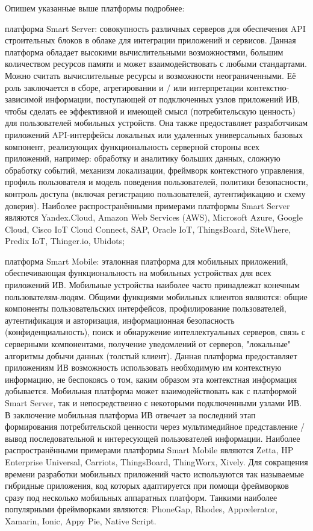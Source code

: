 Опишем указанные выше платформы подробнее:
\begin{textitemize}
    \item платформа Smart Server: совокупность различных серверов для обеспечения API строительных блоков в облаке для интеграции приложений и сервисов. Данная платформа обладает высокими вычислительными возможностями, большим количеством ресурсов памяти и может взаимодействовать с любыми стандартами. Можно считать вычислительные ресурсы и возможности неограниченными. Её роль заключается в сборе, агрегировании и / или интерпретации контекстно-зависимой информации, поступающей от подключенных узлов приложений ИВ, чтобы сделать ее эффективной и имеющей смысл (потребительскую ценность) для пользователей мобильных устройств. Она также предоставляет разработчикам приложений API-интерфейсы локальных или удаленных универсальных базовых компонент, реализующих функциональность серверной стороны всех приложений, например: обработку и аналитику больших данных, сложную обработку событий, механизм локализации, фреймворк контекстного управления, профиль пользователя и модель поведения пользователей, политики безопасности, контроль доступа (включая регистрацию пользователей, аутентификацию и схему доверия). Наиболее распространёнными примерами платформы Smart Server являются Yandex.Cloud, Amazon Web Services (AWS), Microsoft Azure, Google Cloud, Cisco IoT Cloud Connect, SAP, Oracle IoT, ThingsBoard, SiteWhere, Predix IoT, Thinger.io, Ubidots;
    \item платформа Smart Mobile: эталонная платформа для мобильных приложений, обеспечивающая функциональность на мобильных устройствах для всех приложений ИВ. Мобильные устройства наиболее часто принадлежат конечным пользователям-людям. Общими функциями мобильных клиентов являются: общие компоненты пользовательских интерфейсов, профилирование пользователей, аутентификация и авторизация, информационная безопасность (конфиденциальность), поиск и обнаружение интеллектуальных серверов, связь с серверными компонентами, получение уведомлений от серверов, "локальные" алгоритмы добычи данных (толстый клиент). Данная платформа предоставляет приложениям ИВ возможность использовать необходимую им контекстную информацию, не беспокоясь о том, каким образом эта контекстная информация добывается. Мобильная платформа может взаимодействовать как с платформой Smart Server, так и непосредственно с некоторыми подключенными узлами ИВ. В заключение мобильная платформа ИВ отвечает за последний этап формирования потребительской ценности через мультимедийное представление / вывод последовательной и интересующей пользователей информации. Наиболее распространёнными примерами платформы Smart Mobile являются Zetta, HP Enterprise Universal, Carriots, ThingsBoard, ThingWorx, Xively. Для сокращения времени разработки мобильных приложений часто используются так называемые гибридные приложения, код которых адаптируется при помощи фреймворков сразу под несколько мобильных аппаратных платформ. Таикими наиболее популярными фреймворками являются: PhoneGap, Rhodes, Appcelerator, Xamarin, Ionic, Appy Pie, Native Script.

\end{textitemize}
